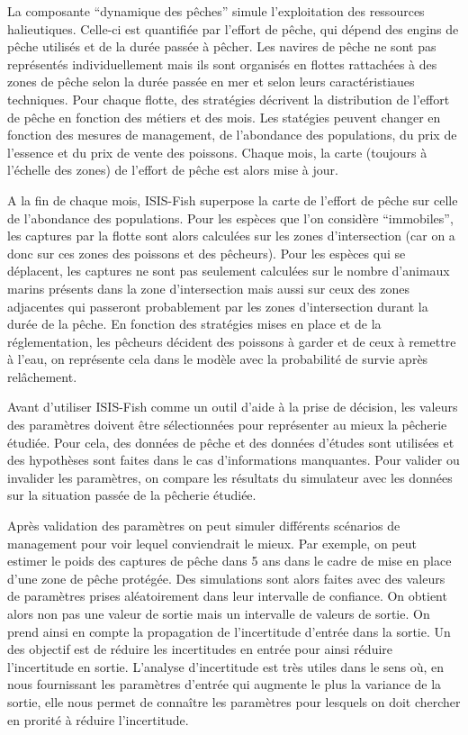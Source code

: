 \documentclass[
]{article}
\begin{document}
La composante ``dynamique des pêches'' simule l'exploitation des
ressources halieutiques. Celle-ci est quantifiée par l'effort de pêche,
qui dépend des engins de pêche utilisés et de la durée passée à pêcher.
Les navires de pêche ne sont pas représentés individuellement mais ils
sont organisés en flottes rattachées à des zones de pêche selon la durée
passée en mer et selon leurs caractéristiaues techniques. Pour chaque
flotte, des stratégies décrivent la distribution de l'effort de pêche en
fonction des métiers et des mois. Les statégies peuvent changer en
fonction des mesures de management, de l'abondance des populations, du
prix de l'essence et du prix de vente des poissons. Chaque mois, la
carte (toujours à l'échelle des zones) de l'effort de pêche est alors
mise à jour.

A la fin de chaque mois, ISIS-Fish superpose la carte de l'effort de
pêche sur celle de l'abondance des populations. Pour les espèces que
l'on considère ``immobiles'', les captures par la flotte sont alors
calculées sur les zones d'intersection (car on a donc sur ces zones des
poissons et des pêcheurs). Pour les espèces qui se déplacent, les
captures ne sont pas seulement calculées sur le nombre d'animaux marins
présents dans la zone d'intersection mais aussi sur ceux des zones
adjacentes qui passeront probablement par les zones d'intersection
durant la durée de la pêche. En fonction des stratégies mises en place
et de la réglementation, les pêcheurs décident des poissons à garder et
de ceux à remettre à l'eau, on représente cela dans le modèle avec la
probabilité de survie après relâchement.

Avant d'utiliser ISIS-Fish comme un outil d'aide à la prise de décision,
les valeurs des paramètres doivent être sélectionnées pour représenter
au mieux la pêcherie étudiée. Pour cela, des données de pêche et des
données d'études sont utilisées et des hypothèses sont faites dans le
cas d'informations manquantes. Pour valider ou invalider les paramètres,
on compare les résultats du simulateur avec les données sur la situation
passée de la pêcherie étudiée.

Après validation des paramètres on peut simuler différents scénarios de
management pour voir lequel conviendrait le mieux. Par exemple, on peut
estimer le poids des captures de pêche dans 5 ans dans le cadre de mise
en place d'une zone de pêche protégée. Des simulations sont alors faites
avec des valeurs de paramètres prises aléatoirement dans leur intervalle
de confiance. On obtient alors non pas une valeur de sortie mais un
intervalle de valeurs de sortie. On prend ainsi en compte la propagation
de l'incertitude d'entrée dans la sortie. Un des objectif est de réduire
les incertitudes en entrée pour ainsi réduire l'incertitude en sortie.
L'analyse d'incertitude est très utiles dans le sens où, en nous
fournissant les paramètres d'entrée qui augmente le plus la variance de
la sortie, elle nous permet de connaître les paramètres pour lesquels on
doit chercher en prorité à réduire l'incertitude.
\end{document}
